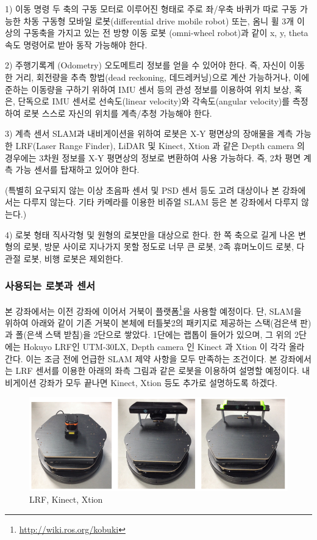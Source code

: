 1) 이동 명령
두 축의 구동 모터로 이루어진 형태로 주로 좌/우축 바퀴가 따로 구동 가능한 차동 구동형 모바일 로봇(differential drive mobile robot) 또는, 옴니 휠 3개 이상의 구동축을 가지고 있는 전 방향 이동 로봇 (omni-wheel robot)과 같이 x, y, theta 속도 명령어로 받아 동작 가능해야 한다.

2) 주행기록계 (Odometry)
오도메트리 정보를 얻을 수 있어야 한다. 즉, 자신이 이동한 거리, 회전량을 추측 항법(dead reckoning, 데드레커닝)으로 계산 가능하거나, 이에 준하는 이동량을 구하기 위하여 IMU 센서 등의 관성 정보를 이용하여 위치 보상, 혹은, 단독으로 IMU 센서로 선속도(linear velocity)와 각속도(angular velocity)를 측정하여 로봇 스스로 자신의 위치를 계측/추청 가능해야 한다.

3) 계측 센서
SLAM과 내비게이션을 위하여 로봇은 X-Y 평면상의 장애물을 계측 가능한 LRF(Laser Range Finder), LiDAR 및 Kinect, Xtion 과 같은 Depth camera 의 경우에는 3차원 정보를 X-Y 평면상의 정보로 변환하여 사용 가능하다. 즉, 2차 평면 계측 가능 센서를 탑재하고 있어야 한다. 

(특별히 요구되지 않는 이상 초음파 센서 및 PSD 센서 등도 고려 대상이나 본 강좌에서는 다루지 않는다. 기타 카메라를 이용한 비쥬얼 SLAM 등은 본 강좌에서 다루지 않는다.)

4) 로봇 형태
직사각형 및 원형의 로봇만을 대상으로 한다. 한 쪽 축으로 길게 나온 변형의 로봇, 방문 사이로 지나가지 못할 정도로 너무 큰 로봇, 2족 휴머노이드 로봇, 다관절 로봇, 비행 로봇은 제외한다.

\subsubsection{사용되는 로봇과 센서}
\label{subsubsec:kobuki_robot_sensor}
본 강좌에서는 이전 강좌에 이어서 거북이 플랫폼\footnote{\url{http://wiki.ros.org/kobuki}}을 사용할 예정이다. 단, SLAM을 위하여 아래와 같이 기존 거북이 본체에 터틀봇2의 패키지로 제공하는 스택(검은색 판)과 폴(은색 스택 받침)을 2단으로 쌓았다. 1단에는 랩톱이 들어가 있으며, 그 위의 2단에는 Hokuyo LRF인 UTM-30LX, Depth camera 인 Kinect 과 Xtion 이 각각 올라간다. 이는 조금 전에 언급한 SLAM 제약 사항을 모두 만족하는 조건이다. 본 강좌에서는 LRF 센서를 이용한 아래의 좌측 그림과 같은 로봇을 이용하여 설명할 예정이다. 내비게이션 강좌가 모두 끝나면 Kinect, Xtion 등도 추가로 설명하도록 하겠다.

\begin{figure}[h]
\centering
\includegraphics[width=0.9\columnwidth]{pictures/chapter11/kobuki_sensors.png}
\caption{LRF, Kinect, Xtion}
\end{figure}

